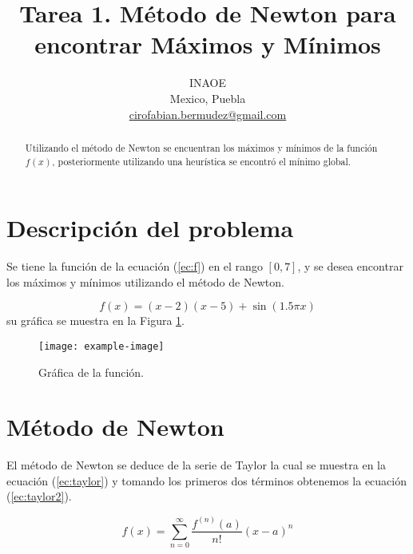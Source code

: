 \documentclass[conference]{IEEEtran}
\begin{document}
\title{Tarea 1. Método de Newton para encontrar Máximos y Mínimos \\
}

\author{
INAOE\\
Mexico, Puebla \\
\url{cirofabian.bermudez@gmail.com}
}

\maketitle

\begin{abstract}
Utilizando el método de Newton se encuentran los máximos y mínimos de la función $f(x)$, posteriormente utilizando una heurística se encontró el mínimo global.
\end{abstract}


\section{Descripción del problema}

Se tiene la función de la ecuación (\ref{ec:f}) en el rango $[0,7]$, y se desea encontrar los máximos y mínimos utilizando el método de Newton.

\begin{equation}
f(x) = (x-2)(x-5) + \sin(1.5 \pi x)
\label{ec:f}
\end{equation} 
su gráfica se muestra en la Figura \ref{fig:f}.

\begin{figure}[hbtp]
\centering
\texttt{[image: example-image]} 
\caption{Gráfica de la función.}
\label{fig:f}
\end{figure}

\section{Método de Newton}

El método de Newton se deduce de la serie de Taylor la cual se muestra en la ecuación (\ref{ec:taylor}) y tomando los primeros dos términos obtenemos la ecuación (\ref{ec:taylor2}).

\begin{equation}
f(x) = \sum_{n=0}^{\infty} \frac{f^{(n)} (a)}{n !} (x -a)^{n}
\label{ec:taylor}
\end{equation}
\end{document}
